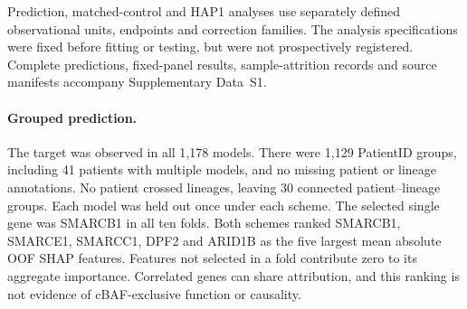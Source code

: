 \documentclass[11pt,letterpaper]{article}
\begin{document}
Prediction, matched-control and HAP1 analyses use separately defined
observational units, endpoints and correction families. The analysis
specifications were fixed before fitting or testing, but were not
prospectively registered. Complete predictions, fixed-panel results,
sample-attrition records and source manifests accompany Supplementary Data~S1.

\paragraph{Grouped prediction.}
The target was observed in all 1{,}178 models. There were 1{,}129 PatientID
groups, including 41 patients with multiple models, and no missing patient
or lineage annotations. No patient crossed lineages, leaving 30 connected
patient--lineage groups. Each model was held out once under each scheme.
The selected single gene was SMARCB1 in all ten folds. Both schemes ranked
SMARCB1, SMARCE1, SMARCC1, DPF2 and ARID1B as the five largest mean absolute
OOF SHAP features. Features not selected in a fold contribute zero to its
aggregate importance. Correlated genes can share attribution, and this
ranking is not evidence of cBAF-exclusive function or causality.
\end{document}
